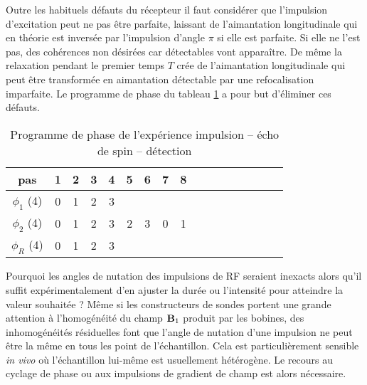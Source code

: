 Outre les habituels défauts du récepteur il faut considérer que l'impulsion
d'excitation peut ne pas être parfaite, laissant de l'aimantation longitudinale
qui en théorie est inversée par l'impulsion d'angle $\pi$ si elle est parfaite.
Si elle ne l'est pas, des cohérences non désirées car détectables vont apparaître.
De même la relaxation pendant le premier temps $T$ crée
de l'aimantation longitudinale qui peut être transformée en aimantation
détectable par une refocalisation imparfaite.
Le programme de phase du tableau \ref{tab:impechodetec} a pour but
d'éliminer ces défauts.

\begin{table}[hbt]
\begin{center}
\begin{tabular}{ccccccccccccccccc}
pas          &  1 &  2 &  3 &  4 &  5 &  6 &  7 &  8 \\
\hline
$\phi_1$ (4) &  0 &  1 &  2 &  3 \\
$\phi_2$ (4) &  0 &  1 &  2 &  3  &  2 &  3 &  0 &  1 \\
$\phi_R$ (4) &  0 &  1 &  2 &  3 \\
\hline
\end{tabular}
\caption{\label{tab:impechodetec}
Programme de phase de l'expérience impulsion -- écho de spin -- détection}
\end{center}
\end{table}

Pourquoi les angles de nutation
des impulsions de RF seraient inexacts alors qu'il suffit expérimentalement
d'en ajuster la durée ou l'intensité pour atteindre la valeur souhaitée ?
Même si les constructeurs de sondes portent une grande attention à l'homogénéité
du champ $\mathbf{B}_1$ produit par les bobines, des inhomogénéités résiduelles font que
l'angle de nutation d'une impulsion ne peut être la même en tous les point de l'échantillon.
Cela est particulièrement sensible \emph{in vivo} où l'échantillon lui-même
est usuellement hétérogène.
Le recours au cyclage de phase ou aux impulsions de gradient de champ est alors
nécessaire.

